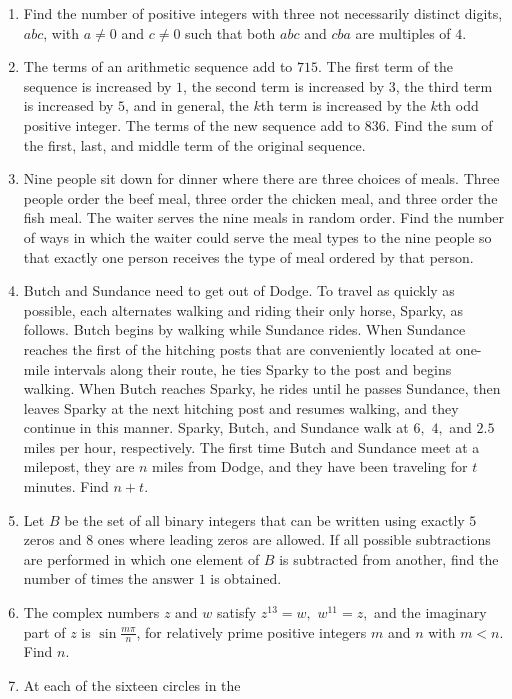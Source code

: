 \documentclass{article}
\begin{document}
\begin{enumerate}[label=\arabic*., itemsep=0.5em]
\item Find the number of positive integers with three not necessarily distinct digits, \(abc\), with \(a \neq 0\) and \(c \neq 0\) such that both \(abc\) and \(cba\) are multiples of \(4\).\par \vspace{0.5em}\item The terms of an arithmetic sequence add to \(715\). The first term of the sequence is increased by \(1\), the second term is increased by \(3\), the third term is increased by \(5\), and in general, the \(k\)th term is increased by the \(k\)th odd positive integer. The terms of the new sequence add to \(836\). Find the sum of the first, last, and middle term of the original sequence.\par \vspace{0.5em}\item Nine people sit down for dinner where there are three choices of meals. Three people order the beef meal, three order the chicken meal, and three order the fish meal. The waiter serves the nine meals in random order. Find the number of ways in which the waiter could serve the meal types to the nine people so that exactly one person receives the type of meal ordered by that person.\par \vspace{0.5em}\item Butch and Sundance need to get out of Dodge. To travel as quickly as possible, each alternates walking and riding their only horse, Sparky, as follows. Butch begins by walking while Sundance rides. When Sundance reaches the first of the hitching posts that are conveniently located at one-mile intervals along their route, he ties Sparky to the post and begins walking. When Butch reaches Sparky, he rides until he passes Sundance, then leaves Sparky at the next hitching post and resumes walking, and they continue in this manner. Sparky, Butch, and Sundance walk at \(6,\) \(4,\) and \(2.5\) miles per hour, respectively. The first time Butch and Sundance meet at a milepost, they are \(n\) miles from Dodge, and they have been traveling for \(t\) minutes. Find \(n + t\).\par \vspace{0.5em}\item Let \(B\) be the set of all binary integers that can be written using exactly \(5\) zeros and \(8\) ones where leading zeros are allowed. If all possible subtractions are performed in which one element of \(B\) is subtracted from another, find the number of times the answer \(1\) is obtained.\par \vspace{0.5em}\item The complex numbers \(z\) and \(w\) satisfy \(z^{13} = w,\) \(w^{11} = z,\) and the imaginary part of \(z\) is \(\sin{\frac{m\pi}{n}}\), for relatively prime positive integers \(m\) and \(n\) with \(m<n.\) Find \(n.\)\par \vspace{0.5em}\item At each of the sixteen circles in the 
\end{enumerate}
\end{document}
